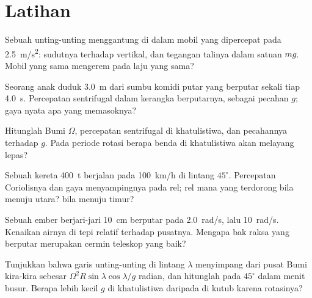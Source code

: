 \section{Latihan}

\begin{exercise}[$\star$]\label{exo:b1:non-inertial-frames:1}
Sebuah unting-unting menggantung di dalam mobil yang dipercepat pada \qty{2.5}{m/s^2}: sudutnya
terhadap vertikal, dan tegangan talinya dalam satuan $mg$. Mobil yang sama
mengerem pada laju yang sama?
\end{exercise}

\begin{exercise}[$\star$]\label{exo:b1:non-inertial-frames:2}
Seorang anak duduk \qty{3.0}{m} dari sumbu komidi putar yang berputar sekali
tiap \qty{4.0}{s}. Percepatan sentrifugal dalam kerangka berputarnya, sebagai
pecahan $g$; gaya nyata apa yang memasoknya?
\end{exercise}

\begin{exercise}[$\star$]\label{exo:b1:non-inertial-frames:3}
Hitunglah  Bumi $\Omega$, percepatan sentrifugal
di khatulistiwa, dan pecahannya terhadap $g$. Pada periode rotasi berapa
benda di khatulistiwa akan melayang lepas?
\end{exercise}

\begin{exercise}[$\star$]\label{exo:b1:non-inertial-frames:4}
Sebuah kereta \qty{400}{t} berjalan pada \qty{100}{km/h} di lintang $45^\circ$.
Percepatan Coriolisnya dan gaya menyampingnya pada rel; rel mana
yang terdorong bila menuju utara? bila menuju timur?
\end{exercise}

\begin{exercise}[$\star\star$]\label{exo:b1:non-inertial-frames:5}
Sebuah ember berjari-jari \qty{10}{cm} berputar pada \qty{2.0}{rad/s}, lalu
\qty{10}{rad/s}. Kenaikan airnya di tepi relatif terhadap pusatnya.
Mengapa bak raksa yang berputar merupakan cermin teleskop yang baik?
\end{exercise}

\begin{exercise}[$\star\star$]\label{exo:b1:non-inertial-frames:6}
Tunjukkan bahwa garis unting-unting di lintang $\lambda$ menyimpang dari pusat
Bumi kira-kira sebesar $\Omega^2R\sin\lambda\cos\lambda/g$ radian, dan hitunglah
pada $45^\circ$ dalam menit busur. Berapa lebih kecil $g$ di khatulistiwa
daripada di kutub  karena rotasinya?
\end{exercise}

